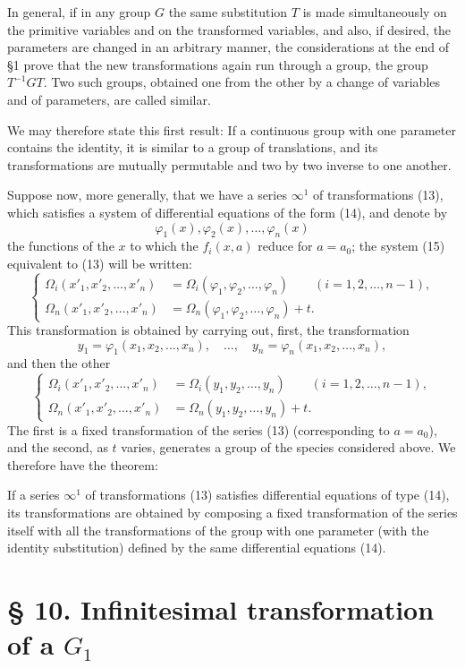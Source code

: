 \documentclass[11pt]{book}
\begin{document}
In general, if in any group $G$ the same substitution $T$ is made simultaneously on the primitive variables and on the transformed variables, and also, if desired, the parameters are changed in an arbitrary manner, the considerations at the end of \S{}1 prove that the new transformations again run through a group, the group $T^{-1}GT$. Two such groups, obtained one from the other by a change of variables and of parameters, are called similar.

We may therefore state this first result:
If a continuous group with one parameter contains the identity, it is similar to a group of translations, and its transformations are mutually permutable and two by two inverse to one another.

Suppose now, more generally, that we have a series $\infty^1$ of transformations (13), which satisfies a system of differential equations of the form (14), and denote by
\[
 \varphi_1(x),\varphi_2(x),\ldots,\varphi_n(x)
\]
the functions of the $x$ to which the $f_i(x,a)$ reduce for $a=a_0$; the system (15) equivalent to (13) will be written:
\[
\left\{
\begin{aligned}
 \Omega_i(x'_1,x'_2,\ldots,x'_n)&=\Omega_i(\varphi_1,\varphi_2,\ldots,\varphi_n)
 \qquad (i=1,2,\ldots,n-1),\\
 \Omega_n(x'_1,x'_2,\ldots,x'_n)&=\Omega_n(\varphi_1,\varphi_2,\ldots,\varphi_n)+t.
\end{aligned}
\right.
\]
This transformation is obtained by carrying out, first, the transformation
\[
 y_1=\varphi_1(x_1,x_2,\ldots,x_n),\quad\ldots,\quad y_n=\varphi_n(x_1,x_2,\ldots,x_n),
\]
and then the other
\[
\left\{
\begin{aligned}
 \Omega_i(x'_1,x'_2,\ldots,x'_n)&=\Omega_i(y_1,y_2,\ldots,y_n)\qquad (i=1,2,\ldots,n-1),\\
 \Omega_n(x'_1,x'_2,\ldots,x'_n)&=\Omega_n(y_1,y_2,\ldots,y_n)+t.
\end{aligned}
\right.
\]
The first is a fixed transformation of the series (13) (corresponding to $a=a_0$), and the second, as $t$ varies, generates a group of the species considered above. We therefore have the theorem:

If a series $\infty^1$ of transformations (13) satisfies differential equations of type (14), its transformations are obtained by composing a fixed transformation of the series itself with all the transformations of the group with one parameter (with the identity substitution) defined by the same differential equations (14).

\section*{\S{} 10. Infinitesimal transformation of a $G_1$}
\end{document}
